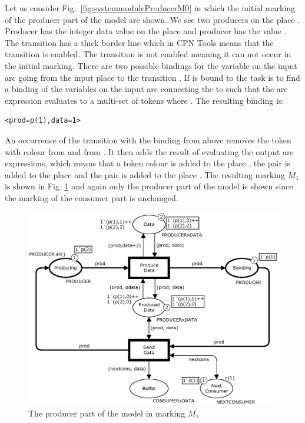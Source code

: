 Let us consider Fig.~\ref{fig:systemmoduleProducerM0} in which the initial marking of the producer part of the model are shown. We see two producers on the place . Producer  has the integer data value  on the place  and producer  has the value . The transition  has a thick border line which in CPN Tools means that the transition is enabled. The transition  is not enabled meaning it can not occur in the initial marking. There are two possible bindings for the variable  on the input arc going from the input place  to the transition . If  is bound to  the task is to find a binding of the variables on the input arc connecting the  to  such that the arc expression evaluates to a multi-set of tokens where . The resulting binding is:

\begin{verbatim}
<prod=p(1),data=1>
\end{verbatim}

\noindent
An occurrence of the transition  with the binding from above removes the token with colour  from  and  from . It then adds the result of evaluating the output arc expressions, which means that a token colour  is added to the place , the pair  is added to the place  and the pair  is added to the place . The resulting marking $M_1$ is shown in Fig. \ref{fig:systemmoduleProducerM1} and again only the producer part of the model is shown since the marking of the consumer part is unchanged. 

\begin{figure}[b!]
\centering
\includegraphics[scale=0.40]{background/graphics/SystemProducerM1.eps}
\caption{The producer part of the model in marking $M_1$}
\label{fig:systemmoduleProducerM1}
\end{figure}

